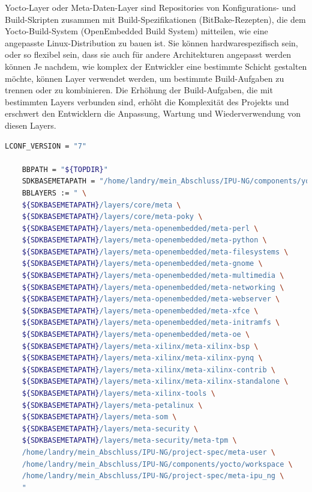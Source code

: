 Yocto-Layer oder Meta-Daten-Layer sind Repositories von Konfigurations- und Build-Skripten zusammen mit Build-Spezifikationen (BitBake-Rezepten), die dem Yocto-Build-System (OpenEmbedded Build System) mitteilen, wie eine angepasste Linux-Distribution zu bauen ist. Sie können hardwarespezifisch sein, oder so flexibel sein, dass sie auch für andere Architekturen angepasst werden können
Je nachdem, wie komplex der Entwickler eine bestimmte Schicht gestalten möchte, können Layer verwendet werden, um bestimmte Build-Aufgaben zu trennen oder zu kombinieren. Die Erhöhung der Build-Aufgaben, die mit  bestimmten Layers verbunden sind, erhöht die Komplexität des Projekts und erschwert den Entwicklern die Anpassung, Wartung und Wiederverwendung von diesen Layers. 

\begin{lstlisting}[backgroundcolor = \color{lightgray},basicstyle=\scriptsize\ttfamily,caption={Inhalt einer bblayers.conf Datei in Yocto},label=lst:bblayers,language=bash,framexleftmargin = 2em]
	LCONF_VERSION = "7"
	
	BBPATH = "${TOPDIR}"
	SDKBASEMETAPATH = "/home/landry/mein_Abschluss/IPU-NG/components/yocto"
	BBLAYERS := " \
	${SDKBASEMETAPATH}/layers/core/meta \
	${SDKBASEMETAPATH}/layers/core/meta-poky \
	${SDKBASEMETAPATH}/layers/meta-openembedded/meta-perl \
	${SDKBASEMETAPATH}/layers/meta-openembedded/meta-python \
	${SDKBASEMETAPATH}/layers/meta-openembedded/meta-filesystems \
	${SDKBASEMETAPATH}/layers/meta-openembedded/meta-gnome \
	${SDKBASEMETAPATH}/layers/meta-openembedded/meta-multimedia \
	${SDKBASEMETAPATH}/layers/meta-openembedded/meta-networking \
	${SDKBASEMETAPATH}/layers/meta-openembedded/meta-webserver \
	${SDKBASEMETAPATH}/layers/meta-openembedded/meta-xfce \
	${SDKBASEMETAPATH}/layers/meta-openembedded/meta-initramfs \
	${SDKBASEMETAPATH}/layers/meta-openembedded/meta-oe \
	${SDKBASEMETAPATH}/layers/meta-xilinx/meta-xilinx-bsp \
	${SDKBASEMETAPATH}/layers/meta-xilinx/meta-xilinx-pynq \
	${SDKBASEMETAPATH}/layers/meta-xilinx/meta-xilinx-contrib \
	${SDKBASEMETAPATH}/layers/meta-xilinx/meta-xilinx-standalone \
	${SDKBASEMETAPATH}/layers/meta-xilinx-tools \
	${SDKBASEMETAPATH}/layers/meta-petalinux \
	${SDKBASEMETAPATH}/layers/meta-som \
	${SDKBASEMETAPATH}/layers/meta-security \
	${SDKBASEMETAPATH}/layers/meta-security/meta-tpm \
	/home/landry/mein_Abschluss/IPU-NG/project-spec/meta-user \
	/home/landry/mein_Abschluss/IPU-NG/components/yocto/workspace \
	/home/landry/mein_Abschluss/IPU-NG/project-spec/meta-ipu_ng \
	"
\end{lstlisting}


